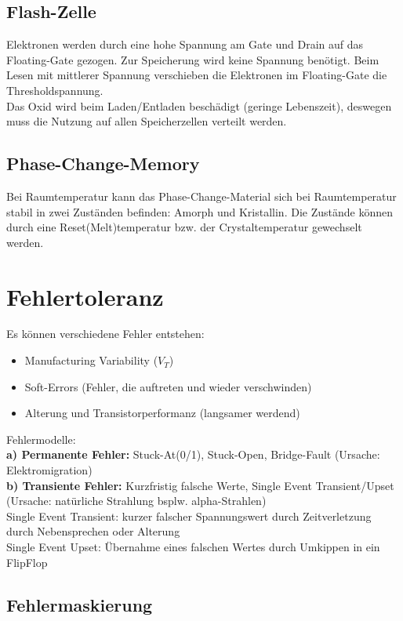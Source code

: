 \documentclass[english]{latex4ei/latex4ei_sheet}
\begin{document}
\subsection{Flash-Zelle}
Elektronen werden durch eine hohe Spannung am Gate und Drain auf das Floating-Gate gezogen. Zur Speicherung wird keine Spannung benötigt. Beim Lesen mit mittlerer Spannung verschieben die Elektronen im Floating-Gate die Thresholdspannung.\\
Das Oxid wird beim Laden/Entladen beschädigt (geringe Lebenszeit), deswegen muss die Nutzung auf allen Speicherzellen verteilt werden.
\subsection{Phase-Change-Memory}
Bei Raumtemperatur kann das Phase-Change-Material sich bei Raumtemperatur stabil in zwei Zuständen befinden: Amorph und Kristallin. Die Zustände können durch eine Reset(Melt)temperatur bzw. der Crystaltemperatur gewechselt werden.


\section{Fehlertoleranz}
Es können verschiedene Fehler entstehen:
\begin{itemize}
    \item Manufacturing Variability ($V_T$)
    \item Soft-Errors (Fehler, die auftreten und wieder verschwinden)
    \item Alterung und Transistorperformanz (langsamer werdend)
\end{itemize}

Fehlermodelle:\\
\textbf{a) Permanente Fehler:} Stuck-At(0/1), Stuck-Open, Bridge-Fault (Ursache: Elektromigration)\\
\textbf{b) Transiente Fehler:} Kurzfristig falsche Werte, Single Event Transient/Upset (Ursache: natürliche Strahlung bsplw. alpha-Strahlen)\\
Single Event Transient: kurzer falscher Spannungswert durch Zeitverletzung durch Nebensprechen oder Alterung\\
Single Event Upset: Übernahme eines falschen Wertes durch Umkippen in ein FlipFlop

\subsection{Fehlermaskierung}
\end{document}
